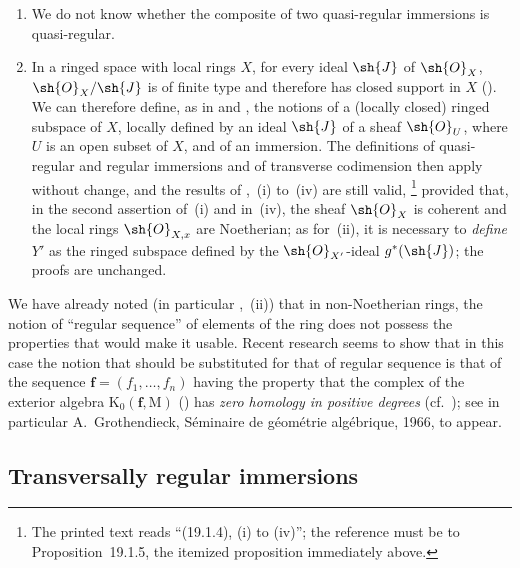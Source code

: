 \begin{remarks}[19.1.7]
\label{IV.19.1.7}
\medskip\noindent
\begin{enumerate}[label=(\roman*)]
  \item We do not know whether the composite of two quasi-regular immersions is quasi-regular.
  \item In a ringed space with local rings $X$, for every ideal $\sh{J}$ of $\sh{O}_X$, $\sh{O}_X/\sh{J}$ is of finite type and therefore has closed support in $X$ ().
We can therefore define, as in  and , the notions of a (locally closed) ringed subspace of $X$, locally defined by an ideal $\sh{J}$ of a sheaf $\sh{O}_U$, where $U$ is an open subset of $X$, and of an immersion.
The definitions of quasi-regular and regular immersions and of transverse codimension then apply without change, and the results of ,~(i) to~(iv) are still valid,
\footnote{The printed text reads ``(19.1.4), (i) to (iv)''; the reference must be to Proposition~19.1.5, the itemized proposition immediately above.}
provided that, in the second assertion of~(i) and in~(iv), the sheaf $\sh{O}_X$ is coherent and the local rings $\sh{O}_{X,x}$ are Noetherian; as for~(ii), it is necessary to \emph{define} $Y'$ as the ringed subspace defined by the $\sh{O}_{X'}$-ideal $g^*(\sh{J})$; the proofs are unchanged.
\end{enumerate}
\end{remarks}

\begin{env}[19.1.8]
\label{IV.19.1.8}
We have already noted (in particular ,~(ii)) that in non-Noetherian rings, the notion of ``regular sequence'' of elements of the ring does not possess the properties that would make it usable.
Recent research seems to show that in this case the notion that should be substituted for that of regular sequence is that of the sequence $\mathbf{f}=(f_1,\ldots,f_n)$ having the property that the complex of the exterior algebra $\mathrm{K}_0(\mathbf{f},\mathrm{M})$ () has \emph{zero homology in positive degrees} (cf.\ ); see in particular A.~Grothendieck, S\'eminaire de g\'eom\'etrie alg\'ebrique, 1966, to appear.
\end{env}

\subsection{Transversally regular immersions}
\label{subsection:IV.19.2}

